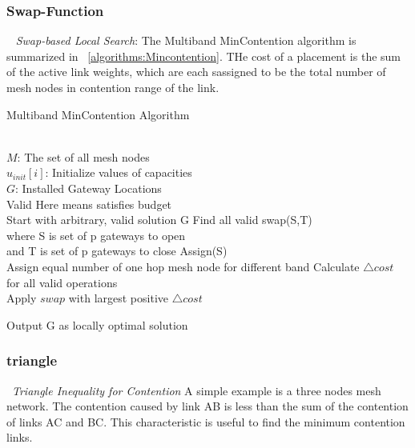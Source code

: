 \subsubsection{Swap-Function}
~\emph{ Swap-based Local Search}: The Multiband MinContention algorithm is summarized in ~\ref{algorithms:Mincontention}. THe cost of a placement is the sum of the active link weights, which are each sassigned to be the total number of mesh nodes in contention range of the link. 


	  \begin{algorithm}
          \small
	  \caption{Multiband MinContention Algorithm}
	  \label{algorithms:Mincontention}
	  \begin{algorithmic}[1]
	  \REQUIRE  ~~\\
		 $M$: The set of all mesh nodes\\
		 $u_{init}[i]$: Initialize values of capacities
\ENSURE ~~\\    
$G$: Installed Gateway Locations \\
Valid Here means satisfies budget \\
Start with arbitrary, valid solution G
\STATE Find all valid swap(S,T)\\
where S is set of p gateways to open\\
and T is set of p gateways to close
\STATE Assign(S) \\
Assign equal number of one hop mesh node for different band
\STATE Calculate $\triangle cost$ for all valid operations\\
\STATE Apply $swap$ with largest positive $\triangle cost$
\ENDWHILE 

Output G as locally optimal solution\\
\end{algorithmic}
\end{algorithm}

\subsubsection{triangle}
~\emph{Triangle Inequality for Contention} A simple example is a three nodes mesh network. The contention caused by link AB is less than the sum of the contention of links AC and BC. This characteristic is useful to find the minimum contention links.
